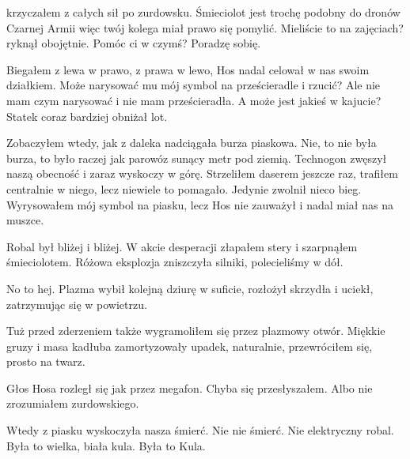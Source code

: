 \begin{dialogue}
\ds{}  \dm{} krzyczałem z całych sił po zurdowsku.
\ds{} Śmieciolot jest trochę podobny do dronów Czarnej Armii więc twój kolega miał prawo się pomylić. Mieliście to na zajęciach? \dm{} ryknął obojętnie. \dm{} Pomóc ci w czymś?
\ds{} Poradzę sobię.
\end{dialogue}

Biegałem z lewa w prawo, z prawa w lewo, Hos nadal celował w nas swoim działkiem.
Może narysować mu mój symbol na prześcieradle i rzucić? Ale nie mam czym narysować i nie mam prześcieradła.
A może jest jakieś w kajucie?
Statek coraz bardziej obniżał lot.

Zobaczyłem wtedy, jak z daleka nadciągała burza piaskowa.
Nie, to nie była burza, to było raczej jak parowóz sunący metr pod ziemią.
Technogon zwęszył naszą obecność i zaraz wyskoczy w górę.
Strzeliłem daserem jeszcze raz, trafiłem centralnie w niego, lecz niewiele to pomagało. Jedynie zwolnił nieco bieg.
Wyrysowałem mój symbol na piasku, lecz Hos nie zauważył i nadal miał nas na muszce.

Robal był bliżej i bliżej.
W akcie desperacji złapałem stery i szarpnąłem śmieciolotem.
Różowa eksplozja zniszczyła silniki, polecieliśmy w dół.
\begin{dialogue}
\ds{} No to hej. \dm{} Plazma wybił kolejną dziurę w suficie, rozłożył skrzydła i uciekł, zatrzymując się w powietrzu.
\end{dialogue}

Tuż przed zderzeniem także wygramoliłem się przez plazmowy otwór.
Miękkie gruzy i masa kadłuba zamortyzowały upadek, naturalnie, przewróciłem się, prosto na twarz.

\begin{dialogue}
\ds{}  \dm{} Głos Hosa rozległ się jak przez megafon.
\ds{}  \dm{} Chyba się przesłyszałem. Albo nie zrozumiałem zurdowskiego.
\end{dialogue}

Wtedy z piasku wyskoczyła nasza śmierć.
Nie nie śmierć. Nie elektryczny robal.
Była to wielka, biała kula.
Była to Kula.

